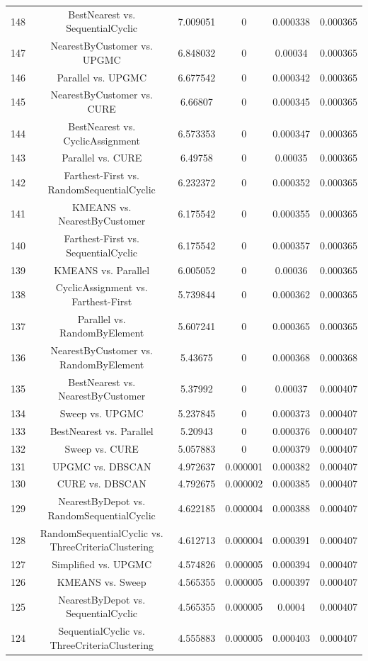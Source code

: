 \documentclass[a4paper,10pt]{article}
\begin{document}
\begin{landscape}
\begin{table}[!htp]
\begin{tabular}{cccccc}
148&BestNearest vs. SequentialCyclic&7.009051&0&0.000338&0.000365\\
147&NearestByCustomer vs. UPGMC&6.848032&0&0.00034&0.000365\\
146&Parallel vs. UPGMC&6.677542&0&0.000342&0.000365\\
145&NearestByCustomer vs. CURE&6.66807&0&0.000345&0.000365\\
144&BestNearest vs. CyclicAssignment&6.573353&0&0.000347&0.000365\\
143&Parallel vs. CURE&6.49758&0&0.00035&0.000365\\
142&Farthest-First vs. RandomSequentialCyclic&6.232372&0&0.000352&0.000365\\
141&KMEANS vs. NearestByCustomer&6.175542&0&0.000355&0.000365\\
140&Farthest-First vs. SequentialCyclic&6.175542&0&0.000357&0.000365\\
139&KMEANS vs. Parallel&6.005052&0&0.00036&0.000365\\
138&CyclicAssignment vs. Farthest-First&5.739844&0&0.000362&0.000365\\
137&Parallel vs. RandomByElement&5.607241&0&0.000365&0.000365\\
136&NearestByCustomer vs. RandomByElement&5.43675&0&0.000368&0.000368\\
135&BestNearest vs. NearestByCustomer&5.37992&0&0.00037&0.000407\\
134&Sweep vs. UPGMC&5.237845&0&0.000373&0.000407\\
133&BestNearest vs. Parallel&5.20943&0&0.000376&0.000407\\
132&Sweep vs. CURE&5.057883&0&0.000379&0.000407\\
131&UPGMC vs. DBSCAN&4.972637&0.000001&0.000382&0.000407\\
130&CURE vs. DBSCAN&4.792675&0.000002&0.000385&0.000407\\
129&NearestByDepot vs. RandomSequentialCyclic&4.622185&0.000004&0.000388&0.000407\\
128&RandomSequentialCyclic vs. ThreeCriteriaClustering&4.612713&0.000004&0.000391&0.000407\\
127&Simplified vs. UPGMC&4.574826&0.000005&0.000394&0.000407\\
126&KMEANS vs. Sweep&4.565355&0.000005&0.000397&0.000407\\
125&NearestByDepot vs. SequentialCyclic&4.565355&0.000005&0.0004&0.000407\\
124&SequentialCyclic vs. ThreeCriteriaClustering&4.555883&0.000005&0.000403&0.000407\\

\end{tabular}
\end{table}
\end{landscape}
\end{document}
